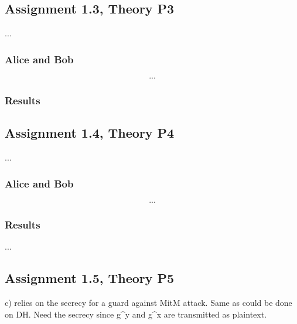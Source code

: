 \documentclass[a4paper]{article}
\begin{document}
\subsection{Assignment 1.3, Theory P3}
...
\subsubsection{Alice and Bob}
\begin{eqnarray*}
...
\end{eqnarray*}
\subsubsection{Results}

\subsection{Assignment 1.4, Theory P4}
...
\subsubsection{Alice and Bob}
\begin{eqnarray*}
...
\end{eqnarray*}
\subsubsection{Results}
...

\subsection{Assignment 1.5, Theory P5}
c) relies on the secrecy for a guard against MitM attack. Same as could be done on DH. Need the secrecy since g^y and g^x are transmitted as plaintext.
\end{document}
